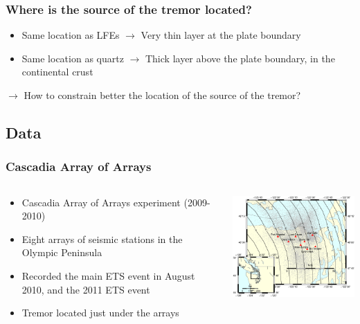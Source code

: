 \documentclass{beamer}
\begin{document}
	\begin{frame}
		\frametitle{Where is the source of the tremor located?}
		\begin{itemize}
			\item Same location as LFEs $\rightarrow$ Very thin layer at the plate boundary
			\item Same location as quartz $\rightarrow$ Thick layer above the plate boundary, in the continental crust
		\end{itemize}

		\begin{block}{}
			$\rightarrow$ How to constrain better the location of the source of the tremor?
		\end{block}
	\end{frame}

	\subsection{Data}

	\begin{frame}
		\frametitle{Cascadia Array of Arrays}
		\begin{columns}[c]
			\begin{column}{5cm}
				\begin{itemize}
					\item Cascadia Array of Arrays experiment (2009-2010)


					\item Eight arrays of seismic stations in the Olympic Peninsula


					\item Recorded the main ETS event in August 2010, and the 2011 ETS event


					\item Tremor located just under the arrays
				\end{itemize}
			\end{column}
			\begin{column}{7cm}
				\begin{center}
					\includegraphics[trim={0cm 1cm 0cm 9.5cm}, clip, width=7cm]{AoA/arrays_location.eps}
				\end{center}
			\end{column}
		\end{columns}
	\end{frame}
\end{document}
